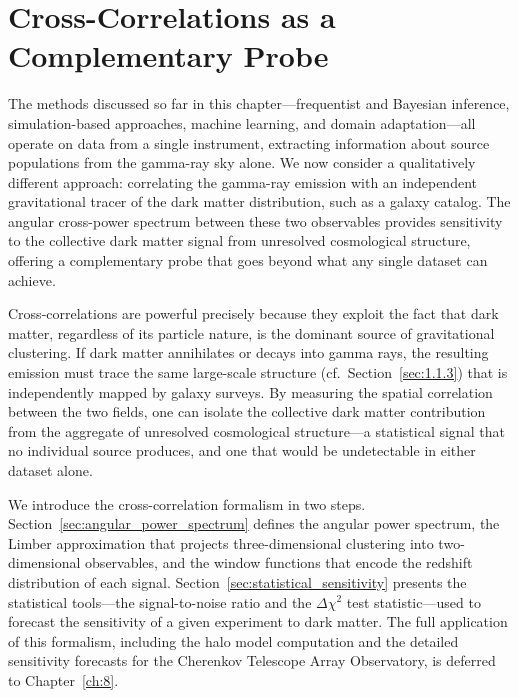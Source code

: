 
\section{Cross-Correlations as a Complementary Probe}
\label{sec:cross_correlations}

The methods discussed so far in this chapter---frequentist and Bayesian inference, simulation-based approaches, machine learning, and domain adaptation---all operate on data from a single instrument, extracting information about source populations from the gamma-ray sky alone.
We now consider a qualitatively different approach: correlating the gamma-ray emission with an independent gravitational tracer of the dark matter distribution, such as a galaxy catalog.
The angular cross-power spectrum between these two observables provides sensitivity to the collective dark matter signal from unresolved cosmological structure, offering a complementary probe that goes beyond what any single dataset can achieve.

Cross-correlations are powerful precisely because they exploit the fact that dark matter, regardless of its particle nature, is the dominant source of gravitational clustering.
If dark matter annihilates or decays into gamma rays, the resulting emission must trace the same large-scale structure (cf.\ Section~\ref{sec:1.1.3}) that is independently mapped by galaxy surveys.
By measuring the spatial correlation between the two fields, one can isolate the collective dark matter contribution from the aggregate of unresolved cosmological structure---a statistical signal that no individual source produces, and one that would be undetectable in either dataset alone.

We introduce the cross-correlation formalism in two steps.
Section~\ref{sec:angular_power_spectrum} defines the angular power spectrum, the Limber approximation that projects three-dimensional clustering into two-dimensional observables, and the window functions that encode the redshift distribution of each signal.
Section~\ref{sec:statistical_sensitivity} presents the statistical tools---the signal-to-noise ratio and the $\Delta\chi^2$ test statistic---used to forecast the sensitivity of a given experiment to dark matter.
The full application of this formalism, including the halo model computation and the detailed sensitivity forecasts for the Cherenkov Telescope Array Observatory, is deferred to Chapter~\ref{ch:8}.

